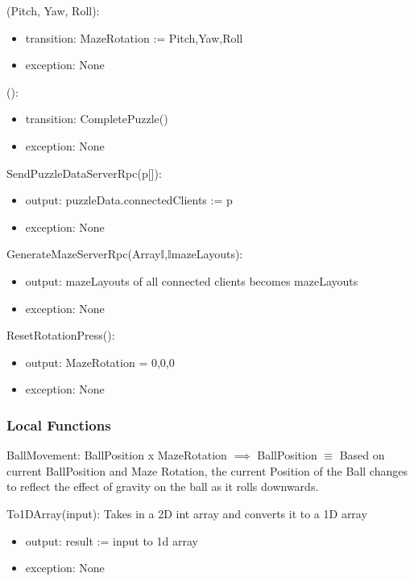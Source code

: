 \documentclass[12pt, titlepage]{article}
\begin{document}
(Pitch, Yaw, Roll):
\begin{itemize}
\item transition: MazeRotation := {Pitch,Yaw,Roll}
\item exception: None
\end{itemize}

():
\begin{itemize}
\item transition: CompletePuzzle()
\item exception: None
\end{itemize}

\noindent SendPuzzleDataServerRpc(p[]):
\begin{itemize}
\item output: puzzleData.connectedClients := p
\item exception: None
\end{itemize}

\noindent GenerateMazeServerRpc(Array\textlangle$\mathds{I}$,$\mathds{I}$\textrangle  mazeLayouts):
\begin{itemize}
\item output: mazeLayouts of all connected clients becomes mazeLayouts
\item exception: None
\end{itemize}

\noindent ResetRotationPress():
\begin{itemize}
\item output: MazeRotation = 0,0,0
\item exception: None
\end{itemize}


\subsubsection{Local Functions}

BallMovement: BallPosition x MazeRotation $\implies$ BallPosition $\equiv$ Based on current BallPosition and Maze Rotation, the current Position of the Ball changes to reflect the effect of gravity on the ball as it rolls downwards. 

\noindent To1DArray(input): Takes in a 2D int array and converts it to a 1D array
\begin{itemize}
    \item output: result := input to 1d array
    \item exception: None
\end{itemize}
\end{document}
